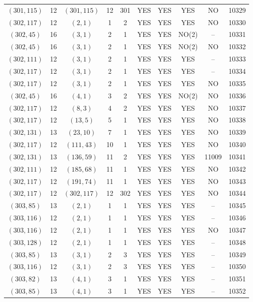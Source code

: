 \begin{longtable}{|c|c|c|c|c|c|c|c|c|c|}
$(301, 115)$ & 12 & $(301, 115)$ & 12 & 301 & YES & YES & YES & NO & 10329\\
$(302, 117)$ & 12 & $(2, 1)$ & 1 & 2 & YES & YES & YES & NO & 10330\\
$(302, 45)$ & 16 & $(3, 1)$ & 2 & 1 & YES & YES & NO(2) & -- & 10331\\
$(302, 45)$ & 16 & $(3, 1)$ & 2 & 1 & YES & YES & NO(2) & NO & 10332\\
$(302, 111)$ & 12 & $(3, 1)$ & 2 & 1 & YES & YES & YES & -- & 10333\\
$(302, 117)$ & 12 & $(3, 1)$ & 2 & 1 & YES & YES & YES & -- & 10334\\
$(302, 117)$ & 12 & $(3, 1)$ & 2 & 1 & YES & YES & YES & NO & 10335\\
$(302, 45)$ & 16 & $(4, 1)$ & 3 & 2 & YES & YES & NO(2) & NO & 10336\\
$(302, 117)$ & 12 & $(8, 3)$ & 4 & 2 & YES & YES & YES & NO & 10337\\
$(302, 117)$ & 12 & $(13, 5)$ & 5 & 1 & YES & YES & YES & NO & 10338\\
$(302, 131)$ & 13 & $(23, 10)$ & 7 & 1 & YES & YES & YES & NO & 10339\\
$(302, 117)$ & 12 & $(111, 43)$ & 10 & 1 & YES & YES & YES & NO & 10340\\
$(302, 131)$ & 13 & $(136, 59)$ & 11 & 2 & YES & YES & YES & 11009 & 10341\\
$(302, 111)$ & 12 & $(185, 68)$ & 11 & 1 & YES & YES & YES & NO & 10342\\
$(302, 117)$ & 12 & $(191, 74)$ & 11 & 1 & YES & YES & YES & NO & 10343\\
$(302, 117)$ & 12 & $(302, 117)$ & 12 & 302 & YES & YES & YES & NO & 10344\\
$(303, 85)$ & 13 & $(2, 1)$ & 1 & 1 & YES & YES & YES & -- & 10345\\
$(303, 116)$ & 12 & $(2, 1)$ & 1 & 1 & YES & YES & YES & -- & 10346\\
$(303, 116)$ & 12 & $(2, 1)$ & 1 & 1 & YES & YES & YES & NO & 10347\\
$(303, 128)$ & 12 & $(2, 1)$ & 1 & 1 & YES & YES & YES & -- & 10348\\
$(303, 85)$ & 13 & $(3, 1)$ & 2 & 3 & YES & YES & YES & -- & 10349\\
$(303, 116)$ & 12 & $(3, 1)$ & 2 & 3 & YES & YES & YES & -- & 10350\\
$(303, 82)$ & 13 & $(4, 1)$ & 3 & 1 & YES & YES & YES & -- & 10351\\
$(303, 85)$ & 13 & $(4, 1)$ & 3 & 1 & YES & YES & YES & -- & 10352\\

\end{longtable}
